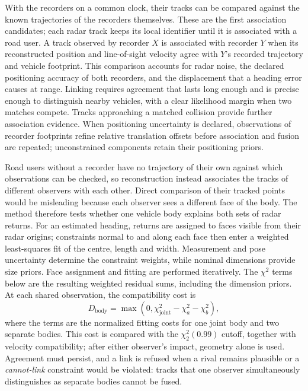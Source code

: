 With the recorders on a common clock, their tracks can be compared
against the known trajectories of the recorders themselves. These are
the first association candidates; each radar track keeps its local
identifier until it is associated with a road user. A track observed by
recorder $X$ is associated with recorder $Y$ when its reconstructed
position and line-of-sight velocity agree with $Y$'s recorded trajectory
and vehicle footprint. This comparison accounts for radar noise, the
declared positioning accuracy of both recorders, and the displacement
that a heading error causes at range. Linking requires agreement that
lasts long enough and is precise enough to distinguish nearby vehicles,
with a clear likelihood margin when two matches compete. Tracks
approaching a matched collision provide further association evidence.
When positioning uncertainty is declared, observations of recorder
footprints refine relative translation offsets before association and
fusion are repeated; unconstrained components retain their positioning
priors.

Road users without a recorder have no trajectory of their own against
which observations can be checked, so reconstruction instead associates
the tracks of different observers with each other. Direct comparison of
their tracked points would be misleading because each observer sees a
different face of the body. The method therefore tests whether one
vehicle body explains both sets of radar returns. For an estimated
heading, returns are assigned to faces visible from their radar origins;
constraints normal to and along each face then enter a weighted
least-squares fit of the centre, length and width. Measurement and pose
uncertainty determine the constraint weights, while nominal dimensions
provide size priors. Face assignment and fitting are performed iteratively.
The $\chi^2$ terms
below are the resulting weighted residual sums, including the dimension
priors. At each shared observation, the compatibility cost is
\begin{equation}
  D_{\mathrm{body}}=\max\!\left(0,
    \chi^2_{\mathrm{joint}}-\chi^2_a-\chi^2_b\right),
  \label{eq:body-compatibility}
\end{equation}
where the terms are the normalized fitting costs for one joint body and
two separate bodies. This cost is compared with the $\chi^2_2(0.99)$ cutoff,
together with velocity compatibility; after either observer's impact,
geometry alone is used. Agreement must persist, and a link is refused
when a rival remains plausible or a \emph{cannot-link} constraint would
be violated: tracks that one observer simultaneously distinguishes as
separate bodies cannot be fused.

